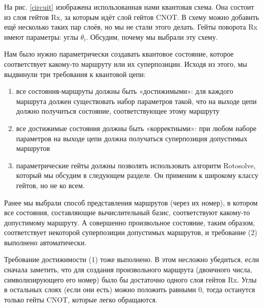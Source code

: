 
На рис. \ref{circuit} изображена использованная нами квантовая схема. Она состоит из слоя гейтов Rx, за которым идёт слой гейтов CNOT. 
В схему можно добавить ещё несколько таких пар слоёв, но мы не стали этого делать.
Гейты поворота Rx имеют параметры: углы $\theta_i$. Обсудим, почему мы выбрали эту схему.


Нам было нужно параметрически создавать квантовое состояние, которое соответствует какому-то маршруту или их суперпозиции. Исходя из этого, мы выдвинули три требования к квантовой цепи:

\begin{enumerate}
    \item все состояния-маршруты должны быть «достижимыми»: для каждого маршрута должен существовать набор параметров такой, что на выходе цепи должно получиться состояние, соответствующее этому маршруту 

    \item все достижимые состояния должны быть «корректными»: при любом наборе параметров на выходе цепи должна получаться суперпозиция допустимых маршрутов
    

    \item параметрические гейты должны позволять использовать алгоритм Rotosolve, который мы обсудим в следующем разделе. Он применим к широкому классу гейтов, но не ко всем.
\end{enumerate}


Ранее мы выбрали способ представления маршрутов (через их номер), в котором все состояния, составляющие вычислительный базис, соответствуют какому-то допустимому маршруту. А совершенно произвольное состояние, таким образом, соответствует некоторой суперпозиции допустимых маршрутов, и требование (2) выполнено автоматически.

Требование достижимости (1) тоже выполнено. В этом несложно убедиться, если сначала заметить, что для создания произвольного маршрута (двоичного числа, символизирующего его номер) было бы достаточно одного слоя гейтов Rx. Углы в остальных слоях (если они есть) можно положить равными 0, тогда останутся только гейты CNOT, которые легко обращаются.

